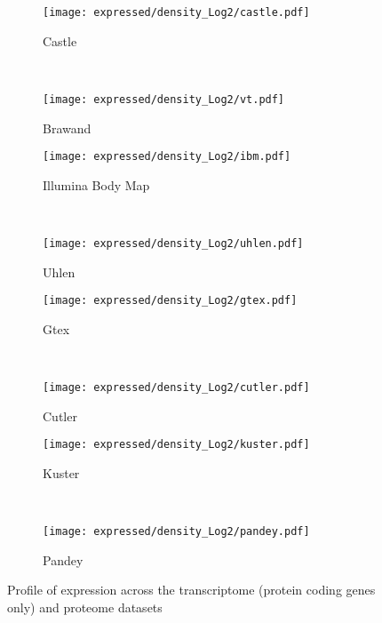 \begin{figure}
    \centering
    \begin{subfigure}[b]{0.35\textwidth}
        \centering \texttt{[image: expressed/density\_Log2/castle.pdf]}
        \caption{Castle}\label{fig:densityCastle_log2}
    \end{subfigure}%
~%
    \begin{subfigure}[b]{0.35\textwidth}
        \centering \texttt{[image: expressed/density\_Log2/vt.pdf]}
        \caption{Brawand}\label{fig:densityBrawand_log2}
    \end{subfigure}

    \begin{subfigure}[b]{0.35\textwidth}
        \centering \texttt{[image: expressed/density\_Log2/ibm.pdf]}
        \caption{Illumina Body Map}\label{fig:densityIBM_log2}
    \end{subfigure}%
~%
    \begin{subfigure}[b]{0.35\textwidth}
        \centering \texttt{[image: expressed/density\_Log2/uhlen.pdf]}
        \caption{Uhlen}\label{fig:densityUhlen_log2}
    \end{subfigure}

    \begin{subfigure}[b]{0.35\textwidth}
        \centering \texttt{[image: expressed/density\_Log2/gtex.pdf]}
        \caption{Gtex}\label{fig:densityGtex_log2}
    \end{subfigure}%
~%
    \begin{subfigure}[b]{0.35\textwidth}
        \centering \texttt{[image: expressed/density\_Log2/cutler.pdf]}
        \caption{Cutler}\label{fig:densityCutler_log2}
    \end{subfigure}

    \begin{subfigure}[b]{0.35\textwidth}
        \centering \texttt{[image: expressed/density\_Log2/kuster.pdf]}
        \caption{Kuster}\label{fig:densityKuster_log2}
    \end{subfigure}%
~%
    \begin{subfigure}[b]{0.35\textwidth}
        \centering \texttt{[image: expressed/density\_Log2/pandey.pdf]}
        \caption{Pandey}\label{fig:densityPandey_log2}
    \end{subfigure}
    \caption{Profile of expression across the transcriptome (protein coding
    genes only) and proteome datasets}\label{fig:distribPlot}
\end{figure}

